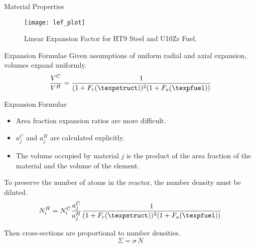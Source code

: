 \begin{frame}{Material Properties}
  \begin{figure}
    \centering
    \texttt{[image: lef\_plot]}
    \caption{Linear Expansion Factor for HT9 Steel and U10Zr Fuel.}
    \label{fig:lef_plot}
  \end{figure}
\end{frame}

\begin{frame}{Expansion Formulae}
  Given assumptions of uniform radial and axial expansion, volumes expand
  uniformly.
  \begin{equation}
    \label{eq:volume_ratio}
    \frac{V^C}{V^H} = \frac{1}{(1+F_r(\texpstruct))^2 (1+F_a(\texpfuel))}
  \end{equation}

\end{frame}

\begin{frame}{Expansion Formulae}
  \begin{itemize}
    \item Area fraction expansion ratios are more difficult.
    \item $a_j^C$ and $a_j^H$ are calculated explicitly.
    \item The volume occupied by material $j$ is the product of the 
      area fraction of the material and the volume of the element.
  \end{itemize}

  To preserve the number of atoms in the reactor, the number density must be
  diluted.
  \begin{equation}
    \label{eq:nden_thexp_update}
    N_i^H = N_i^C \frac{a_j^C}{a_j^H} 
      \frac{1}{(1+F_r(\texpstruct))^2 (1+F_a(\texpfuel))}
  \end{equation}

  Then cross-sections are proportional to number densities.
  \begin{equation}
    \Sigma = \sigma \, N
  \end{equation}
\end{frame}

